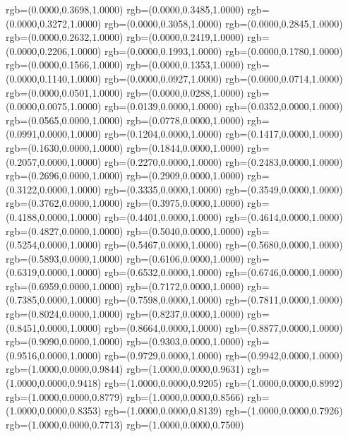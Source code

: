 {{		rgb=(0.0000,0.3698,1.0000)
		rgb=(0.0000,0.3485,1.0000)
		rgb=(0.0000,0.3272,1.0000)
		rgb=(0.0000,0.3058,1.0000)
		rgb=(0.0000,0.2845,1.0000)
		rgb=(0.0000,0.2632,1.0000)
		rgb=(0.0000,0.2419,1.0000)
		rgb=(0.0000,0.2206,1.0000)
		rgb=(0.0000,0.1993,1.0000)
		rgb=(0.0000,0.1780,1.0000)
		rgb=(0.0000,0.1566,1.0000)
		rgb=(0.0000,0.1353,1.0000)
		rgb=(0.0000,0.1140,1.0000)
		rgb=(0.0000,0.0927,1.0000)
		rgb=(0.0000,0.0714,1.0000)
		rgb=(0.0000,0.0501,1.0000)
		rgb=(0.0000,0.0288,1.0000)
		rgb=(0.0000,0.0075,1.0000)
		rgb=(0.0139,0.0000,1.0000)
		rgb=(0.0352,0.0000,1.0000)
		rgb=(0.0565,0.0000,1.0000)
		rgb=(0.0778,0.0000,1.0000)
		rgb=(0.0991,0.0000,1.0000)
		rgb=(0.1204,0.0000,1.0000)
		rgb=(0.1417,0.0000,1.0000)
		rgb=(0.1630,0.0000,1.0000)
		rgb=(0.1844,0.0000,1.0000)
		rgb=(0.2057,0.0000,1.0000)
		rgb=(0.2270,0.0000,1.0000)
		rgb=(0.2483,0.0000,1.0000)
		rgb=(0.2696,0.0000,1.0000)
		rgb=(0.2909,0.0000,1.0000)
		rgb=(0.3122,0.0000,1.0000)
		rgb=(0.3335,0.0000,1.0000)
		rgb=(0.3549,0.0000,1.0000)
		rgb=(0.3762,0.0000,1.0000)
		rgb=(0.3975,0.0000,1.0000)
		rgb=(0.4188,0.0000,1.0000)
		rgb=(0.4401,0.0000,1.0000)
		rgb=(0.4614,0.0000,1.0000)
		rgb=(0.4827,0.0000,1.0000)
		rgb=(0.5040,0.0000,1.0000)
		rgb=(0.5254,0.0000,1.0000)
		rgb=(0.5467,0.0000,1.0000)
		rgb=(0.5680,0.0000,1.0000)
		rgb=(0.5893,0.0000,1.0000)
		rgb=(0.6106,0.0000,1.0000)
		rgb=(0.6319,0.0000,1.0000)
		rgb=(0.6532,0.0000,1.0000)
		rgb=(0.6746,0.0000,1.0000)
		rgb=(0.6959,0.0000,1.0000)
		rgb=(0.7172,0.0000,1.0000)
		rgb=(0.7385,0.0000,1.0000)
		rgb=(0.7598,0.0000,1.0000)
		rgb=(0.7811,0.0000,1.0000)
		rgb=(0.8024,0.0000,1.0000)
		rgb=(0.8237,0.0000,1.0000)
		rgb=(0.8451,0.0000,1.0000)
		rgb=(0.8664,0.0000,1.0000)
		rgb=(0.8877,0.0000,1.0000)
		rgb=(0.9090,0.0000,1.0000)
		rgb=(0.9303,0.0000,1.0000)
		rgb=(0.9516,0.0000,1.0000)
		rgb=(0.9729,0.0000,1.0000)
		rgb=(0.9942,0.0000,1.0000)
		rgb=(1.0000,0.0000,0.9844)
		rgb=(1.0000,0.0000,0.9631)
		rgb=(1.0000,0.0000,0.9418)
		rgb=(1.0000,0.0000,0.9205)
		rgb=(1.0000,0.0000,0.8992)
		rgb=(1.0000,0.0000,0.8779)
		rgb=(1.0000,0.0000,0.8566)
		rgb=(1.0000,0.0000,0.8353)
		rgb=(1.0000,0.0000,0.8139)
		rgb=(1.0000,0.0000,0.7926)
		rgb=(1.0000,0.0000,0.7713)
		rgb=(1.0000,0.0000,0.7500)
	}
}
